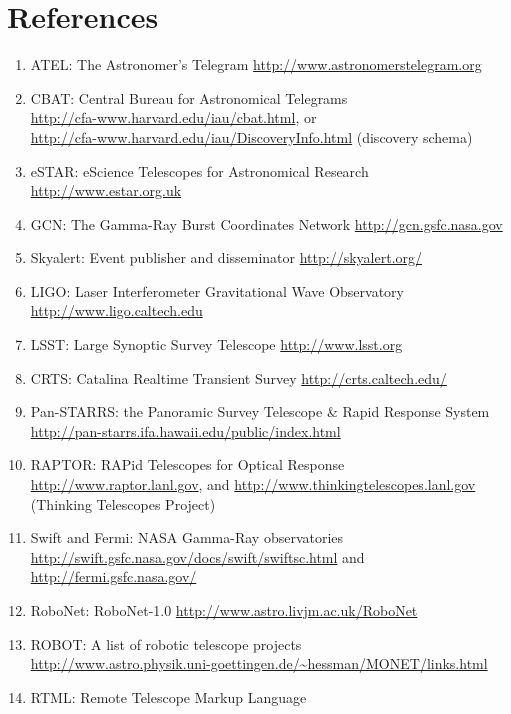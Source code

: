 \documentclass[11pt,a4paper]{ivoa}
\begin{document}
\section{References}
\begin{enumerate}
\item\label{bib01} ATEL: The Astronomer's Telegram \url{http://www.astronomerstelegram.org} 
\item\label{bib02} CBAT: Central Bureau for Astronomical Telegrams \\
\url{http://cfa-www.harvard.edu/iau/cbat.html}, or\\ 
\url{http://cfa-www.harvard.edu/iau/DiscoveryInfo.html} (discovery schema) 
\item\label{bib03} eSTAR: eScience Telescopes for Astronomical Research \url{http://www.estar.org.uk}
\item\label{bib04} GCN: The Gamma-Ray Burst Coordinates Network \url{http://gcn.gsfc.nasa.gov}
\item\label{bib05} Skyalert: Event publisher and disseminator \url{http://skyalert.org/}
\item\label{bib06} LIGO: Laser Interferometer Gravitational Wave Observatory \url{http://www.ligo.caltech.edu} 
\item\label{bib07} LSST: Large Synoptic Survey Telescope \url{http://www.lsst.org} 
\item\label{bib08} CRTS: Catalina Realtime Transient Survey \url{http://crts.caltech.edu/} 
\item\label{bib09} Pan-STARRS: the Panoramic Survey Telescope \& Rapid Response System\\
\url{http://pan-starrs.ifa.hawaii.edu/public/index.html}
\item\label{bib10} RAPTOR: RAPid Telescopes for Optical Response \\
\url{http://www.raptor.lanl.gov}, and \url{http://www.thinkingtelescopes.lanl.gov} (Thinking Telescopes Project) 
\item\label{bib11} Swift and Fermi: NASA Gamma-Ray observatories\\
\url{http://swift.gsfc.nasa.gov/docs/swift/swiftsc.html} and \url{http://fermi.gsfc.nasa.gov/} 
\item\label{bib12} RoboNet: RoboNet-1.0 \url{http://www.astro.livjm.ac.uk/RoboNet}
\item\label{bib13} ROBOT: A list of robotic telescope projects \\
\url{http://www.astro.physik.uni-goettingen.de/~hessman/MONET/links.html}
\item\label{bib14} RTML: Remote Telescope Markup Language\\

\end{enumerate}
\end{document}
